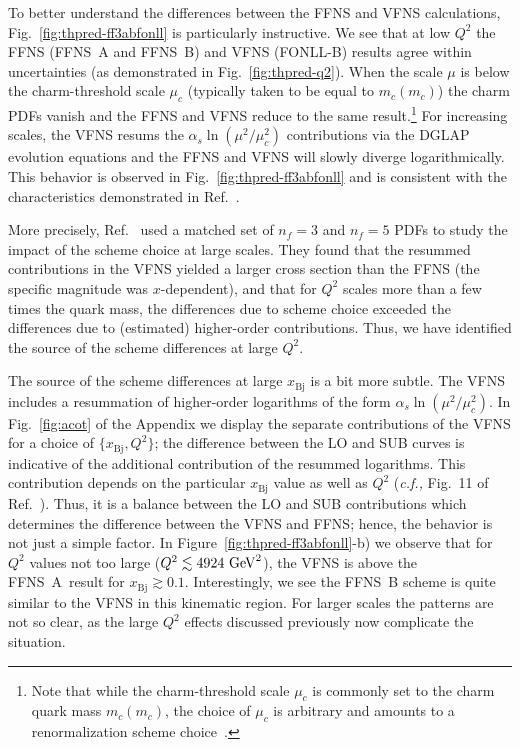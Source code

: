 \documentclass[pdftex,twocolumn,epjc3]{svjour3}          %
\newcommand{\xbj}{\ensuremath{x_{\text{Bj}}}\xspace}
\newcommand{\fonll} {{FONLL-B}\xspace}
\newcommand{\ffns} {{FFNS~A}\xspace}
\newcommand{\ffnsb} {{FFNS~B}\xspace}
\begin{document}
%
%
To better understand the differences between the FFNS and VFNS
calculations, Fig.~\ref{fig:thpred-ff3abfonll} is particularly
instructive.
%
We see that at low $Q^2$ the FFNS (\ffns and \ffnsb) and VFNS
(\fonll) results agree within uncertainties (as demonstrated in 
Fig.~\ref{fig:thpred-q2}). When the scale $\mu$ is
below the charm-threshold scale $\mu_c$ (typically taken to be equal
to $m_c(m_c)$) the charm PDFs vanish and the FFNS and VFNS reduce to
the same result.\footnote{Note that while the charm-threshold scale
  $\mu_c$ is commonly set to the charm quark mass $m_c(m_c)$, the
  choice of $\mu_c$ is arbitrary and amounts to a renormalization
  scheme choice~\cite{Bertone:2017ehk}.}
%
For increasing scales, the VFNS resums the $\alpha_s\ln(\mu^2/\mu_c^2)$
contributions via the DGLAP evolution equations and the FFNS and VFNS
will slowly diverge logarithmically. This behavior is observed in
\hbox{Fig.~\ref{fig:thpred-ff3abfonll}} and is consistent with the
characteristics demonstrated in Ref.~\cite{Kusina:2013slm}.

More precisely, Ref.~\cite{Kusina:2013slm} used a matched set of
$n_f=3$ and $n_f=5$ PDFs to study the impact of the scheme choice at
large scales. They found that the resummed contributions in the VFNS
yielded a larger cross section than the FFNS (the specific magnitude
was $x$-dependent), and that for $Q^2$ scales more than a few times
the quark mass, the differences due to scheme choice exceeded the
differences due to (estimated) higher-order
contributions.
%
Thus, we have identified the source of the scheme differences at large $Q^2$.


%
The  source of the scheme differences at large $\xbj$ is a bit more subtle. 
The VFNS includes a resummation of higher-order logarithms of the form $\alpha_s \ln(\mu^2/\mu_c^2 )$.
In Fig.~\ref{fig:acot} of the Appendix we display the separate contributions of the VFNS for a choice of
$\{\xbj,Q^2\}$; the difference  between the LO and SUB curves is indicative of the
additional contribution of the resummed logarithms.
This contribution depends on the particular $\xbj$ value as well as $Q^2$
({\it c.f.,} Fig.~11 of Ref.~\cite{Kusina:2013slm}).
%
Thus, it is a balance between the LO and SUB contributions which determines the
difference between the VFNS and FFNS; hence,  the behavior is not just a simple factor.
%
In 
Figure~\ref{fig:thpred-ff3abfonll}-b)
we observe that for $Q^2$ values not too large ($Q^2 \lesssim 4924~{\rm GeV}^2$),
the VFNS is above the \ffns\ result for $\xbj \gtrsim 0.1$.
Interestingly, we see the \ffnsb scheme is quite similar to the VFNS in this kinematic region. 
%
For larger scales the patterns are not so clear, as the large $Q^2$ effects discussed previously
now complicate the situation. 
%
%
\end{document}
